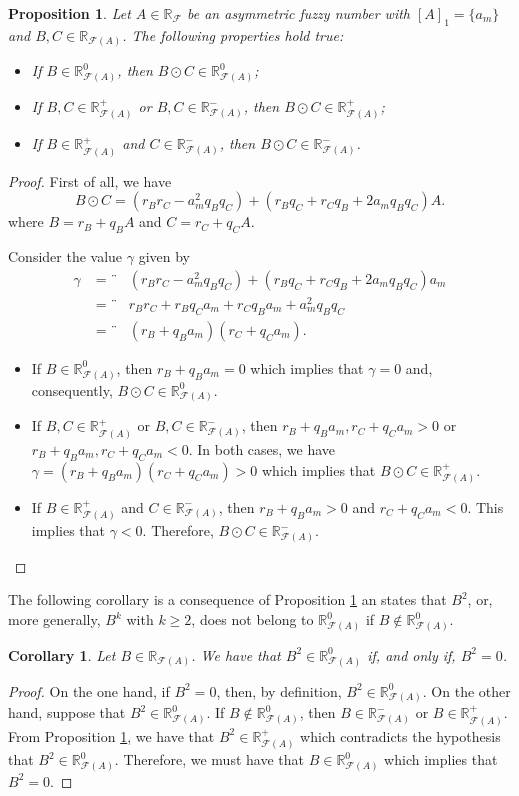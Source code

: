 \documentclass[12pt,a4paper]{article}
\newcommand{\RF}{\mathbb{R}_\mathcal{F}}
\newcommand{\RFA}{\mathbb{R}_{\mathcal{F}(A)}}
\newtheorem{proposition}{Proposition}
\newtheorem{corollary}{Corollary}
\begin{document}
\begin{proposition}\label{prop:sign}
Let $A \in \RF$ be an asymmetric fuzzy number with $[A]_1 = \{a_m\}$ and $B,C \in \RFA$.
The following properties hold true:
\begin{itemize}
\item[1)] If $B \in \RFA^0$, then $B\odot C \in \RFA^0$;
\item[2)] If $B,C \in \RFA^+$ or $B,C \in \RFA^-$, then $B\odot C \in \RFA^+$;
\item[3)] If $B \in \RFA^+$ and $C \in \RFA^-$, then $B\odot C \in \RFA^-$.
\end{itemize}    
\end{proposition}
\begin{proof}
First of all, we have 
$$
B \odot C = (r_Br_C - a_m^2q_Bq_C) + (r_Bq_C + r_Cq_B + 2a_mq_Bq_C)A. 
$$
where $B=r_B + q_BA$ and $C=r_C + q_CA$. 

Consider the value $\gamma$ given by 
\begin{eqnarray*}
\gamma & = ¨& (r_Br_C - a_m^2q_Bq_C) + (r_Bq_C + r_Cq_B + 2a_mq_Bq_C)a_m \\
 & = ¨& r_Br_C + r_Bq_Ca_m + r_Cq_Ba_m + a_m^2q_Bq_C \\
 & = ¨& (r_B + q_Ba_m)(r_C + q_Ca_m).
\end{eqnarray*}

\begin{itemize}
\item[1)] If $B \in \RFA^0$, then $r_B + q_Ba_m = 0$ which implies that $\gamma = 0$ and, consequently, $B \odot C \in \RFA^0$. 
\item[2)] If $B,C \in \RFA^+$ or $B,C \in \RFA^-$, then $r_B + q_Ba_m, r_C + q_Ca_m > 0$ or 
$r_B + q_Ba_m, r_C + q_Ca_m < 0$. In both cases, we have 
$\gamma = (r_B + q_Ba_m)(r_C + q_Ca_m) > 0$ which implies that $B \odot C \in \RFA^+$. 
\item[3)] If $B \in \RFA^+$ and $C \in \RFA^-$, then $r_B + q_Ba_m > 0$ and 
$r_C + q_Ca_m < 0$. This implies that $\gamma < 0$. Therefore, $B\odot C \in \RFA^-$.
\end{itemize}    
\end{proof}

The following corollary is a consequence of Proposition \ref{prop:sign} an states that 
$B^2$, or, more generally, $B^k$ with $k\geq 2$, does not belong to $\RFA^0$ if $B \not\in \RFA^0$. 

\begin{corollary}
Let $B \in \RFA$. We have that $B^2 \in \RFA^0$ if, and only if, $B^2 = 0$.   
\end{corollary}
\begin{proof}
On the one hand, if  $B^2 = 0$, then, by definition, $B^2 \in \RFA^0$.  On the other hand, suppose that $B^2 \in \RFA^0$. If $B \not\in \RFA^0$, then $B \in \RFA^-$ or $B \in \RFA^+$. From Proposition \ref{prop:sign}, we have that $B^2 \in \RFA^+$ which contradicts the hypothesis that 
$B^2 \in \RFA^0$. Therefore, we must have that $B \in \RFA^0$ which implies that $B^2 = 0$.
\end{proof}
\end{document}
